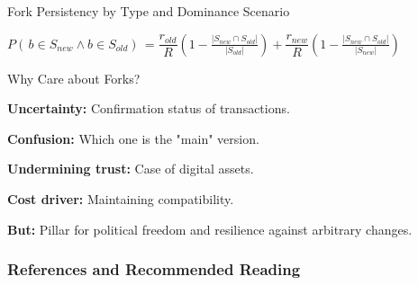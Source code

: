 \documentclass[handout]{beamer}
\begin{document}
\begin{frame}{Fork Persistency by Type and Dominance Scenario}

\center \footnotesize
$P(\,b \in S_{new} \wedge b \in S_{old})\, = \dfrac{r_{old}}{R} \left( 1-\frac{|S_{new} \cap S_{old}|}{|S_{old}|}\right) + \dfrac{r_{new}}{R} \left( 1-\frac{|S_{new} \cap S_{old}|}{|S_{new}|}\right)$ 
\label{eq:forkprobability}

\vspace{1.5em}


	\begin{table}
		
		\caption{Persistency by fork type and scenario \cite{schar2020blockchain}}
		\label{tbl:forkpersistencies}
	\end{table}

	


	
\end{frame}



\begin{frame}{Why Care about Forks?}

\textbf{Uncertainty:} Confirmation status of transactions.
\vspace{1.5em}

\textbf{Confusion:} Which one is the "main" version.
\vspace{1.5em}

\textbf{Undermining trust:} Case of digital assets.
\vspace{1.5em}

\textbf{Cost driver:} Maintaining compatibility.
\vspace{1.5em}

\color{focus} \textbf{But:} \color{black} Pillar for political freedom and resilience against arbitrary changes.

	
\end{frame}

\begin{frame}%
\frametitle{References and Recommended Reading}

	
	

\end{frame}
\end{document}
